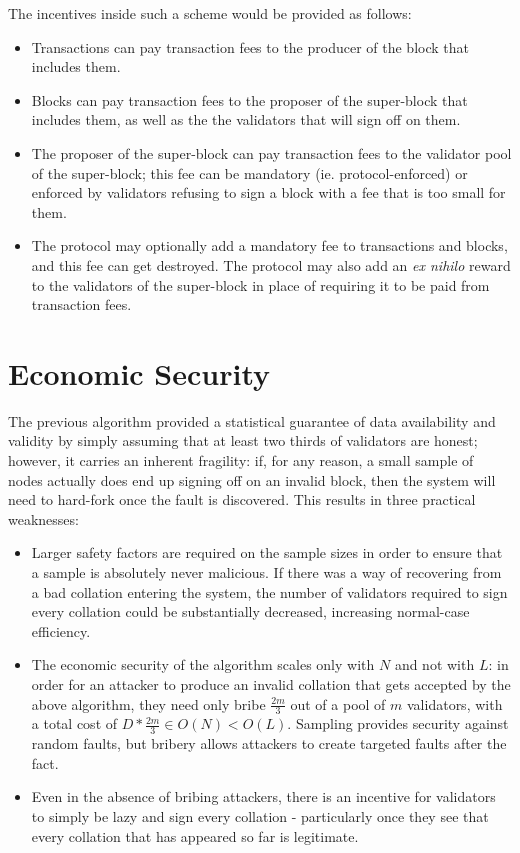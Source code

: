 \documentclass[11pt,a4paper]{article}
\theoremstyle{plain}
\theoremstyle{definition}
\theoremstyle{remark}
\begin{document}
The incentives inside such a scheme would be provided as follows:

\begin{itemize}
\item
Transactions can pay transaction fees to the producer of the block that includes them.
\item
Blocks can pay transaction fees to the proposer of the super-block that includes them, as well as the the validators that will sign off on them.
\item
The proposer of the super-block can pay transaction fees to the validator pool of the super-block; this fee can be mandatory (ie. protocol-enforced) or enforced by validators refusing to sign a block with a fee that is too small for them.
\item
The protocol may optionally add a mandatory fee to transactions and blocks, and this fee can get destroyed. The protocol may also add an \emph{ex nihilo} reward to the validators of the super-block in place of requiring it to be paid from transaction fees.
\end{itemize}

\section{Economic Security}

The previous algorithm provided a statistical guarantee of data availability and validity by simply assuming that at least two thirds of validators are honest; however, it carries an inherent fragility: if, for any reason, a small sample of nodes actually does end up signing off on an invalid block, then the system will need to hard-fork once the fault is discovered. This results in three practical weaknesses:

\begin{itemize}
\item
Larger safety factors are required on the sample sizes in order to ensure that a sample is absolutely never malicious. If there was a way of recovering from a bad collation entering the system, the number of validators required to sign every collation could be substantially decreased, increasing normal-case efficiency.
\item
The economic security of the algorithm scales only with $N$ and not with $L$: in order for an attacker to produce an invalid collation that gets accepted by the above algorithm, they need only bribe $\frac{2m}{3}$ out of a pool of $m$ validators, with a total cost of $D * \frac{2m}{3} \in O(N) < O(L)$. Sampling provides security against random faults, but bribery allows attackers to create targeted faults after the fact.
\item
Even in the absence of bribing attackers, there is an incentive for validators to simply be lazy and sign every collation - particularly once they see that every collation that has appeared so far is legitimate.
\end{itemize}
\end{document}
